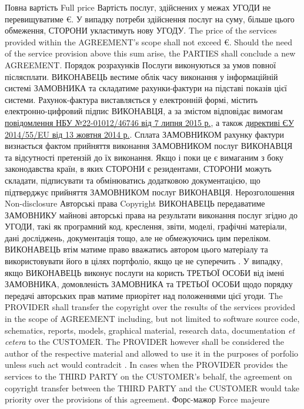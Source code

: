 \begin{Form}
\begin{paracol}{3}
        {}
        {}
      \clause
        {Повна вартість}
        {Full price}
        {}
        {Вартість послуг, здійснених у межах УГОДИ не перевищуватиме  €. У випадку потреби здійснення послуг на суму, більше цього обмеження, СТОРОНИ укластимуть нову УГОДУ.}
        {The price of the services provided within the AGREEMENT's scope shall not exceed  €. Should the need of the service provision above this sum arise, the PARTIES shall conclude a new AGREEMENT.}
        {}
      \clause %
        {Порядок розрахунків}
        {}
        {}
        {\label{sec:payment}Послуги виконуються за умов повної післясплати. ВИКОНАВЕЦЬ вестиме облік часу виконання у інформаційній системі ЗАМОВНИКА та складатиме рахунки-фактури на підставі показів цієї системи. Рахунок-фактура виставляється у електронній формі, містить електронно-цифровий підпис ВИКОНАВЦЯ, а за змістом відповідає вимогам \href{http://bank.gov.ua/doccatalog/document?id=19208488}{повідомлення НБУ №22-01012/46746 від 7 липня 2015 р.}, а також \href{http://eur-lex.europa.eu/legal-content/EN/TXT/?uri=CELEX:32014L0055}{директиві ЄУ 2014/55/EU від 13 жовтня 2014 р.}. Сплата ЗАМОВНИКОМ рахунку фактури визнається фактом прийняття виконання ЗАМОВНИКОМ послуг ВИКОНАВЦЯ та відсутності претензій до їх виконання. Якщо і поки це є вимаганим з боку законодавства країн, в яких СТОРОНИ є резидентами, СТОРОНИ можуть складати, підписувати та обмінюватись додатковою документацією, що підтверджує прийняття ЗАМОВНИКОМ послуг ВИКОНАВЦЯ.}
        {}
        {}
      \clause
        {Нерозголошення}
        {Non-disclosure}
        {}
        {\label{sec:nda}}
        {}
        {}
      \clause
        {Авторські права}
        {Copyright}
        {}
        {ВИКОНАВЕЦЬ передаватиме ЗАМОВНИКУ майнові авторські права на результати виконання послуг згідно до УГОДИ, такі як програмний код, креслення, звіти, моделі, графічні матеріали, дані досліджень, документація тощо, але не обмежуючись цим переліком. ВИКОНАВЕЦЬ втім матиме право вважатись автором цього матеріалу та використовувати його в цілях портфоліо, якщо це не суперечить . У випадку, якщо ВИКОНАВЕЦЬ виконує послуги на користь ТРЕТЬОЇ ОСОБИ від імені ЗАМОВНИКА, домовленість ЗАМОВНИКА та ТРЕТЬОЇ ОСОБИ щодо порядку передачі авторських прав матиме приорітет над положеннями цієї угоди.}
        {The PROVIDER shall transfer the copyright over the results of the services provided in the scope of AGREEMENT including, but not limited to software source code, schematics, reports, models, graphical material, research data, documentation \emph{et ce\-te\-ra} to the CUSTOMER. The PROVIDER however shall be considered the author of the respective material and allowed to use it in the purposes of porfolio unless such act would contradcit . In cases when the PROVIDER provides the services to the THIRD PARTY on the CUSTOMER's behalf, the agreement on copyright transfer between the THIRD PARTY and the CUSTOMER would take priority over the provisions of this agreement.}
        {}
      \clause
        {Форс-мажор}
        {Force majeure}
        {}
        {\label{sec:nda}}
        {}
        {}


\end{paracol}
\end{Form}
